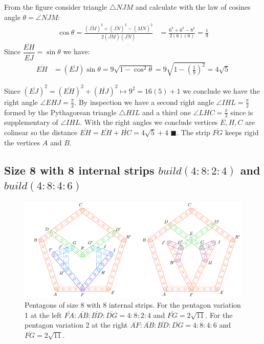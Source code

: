 \documentclass[11pt]{article}
\begin{document}
From the figure consider triangle $\triangle{NJM}$ and calculate with the law of cosines angle $\theta = \angle{NJM}$:
\begin{align}
\cos\theta = \frac{(\overline{JM})^2 + (\overline{JN})^2 
 - (\overline{MN})^2}{2(\overline{JM})(\overline{JN})}
 &= \frac{6^2 + 6^2 - 8^2}{2(6)(6)} = \frac{1}9
\end{align}
Since $\dfrac{\overline{EH}}{\overline{EJ}} = \sin\theta$ we have:
\begin{align}
\overline{EH} &= (\overline{EJ})\sin\theta
 = 9\sqrt{1-\cos^2\theta} 
 = 9\sqrt{1-\left(\frac{1}9\right)^2} = 4\sqrt5
\end{align}

Since $(\overline{EJ})^2 = (\overline{EH})^2 + (\overline{HJ})^2 \mapsto 9^2 = 16(5) + 1$ we conclude we have the right angle $\angle{EHJ} = \frac{\pi}2$. By inspection we have a second right angle $\angle{IHL} = \frac{\pi}2$ formed by the Pythagorean triangle $\triangle{HIL}$ and a third one $\angle{LHC} = \frac{\pi}2$ since is supplementary of $\angle{IHL}$. With the right angles we conclude vertices $E,H,C$ are colinear so the distance $\overline{EH} = \overline{EH} + \overline{HC} = 4\sqrt{5} + 4$ $\blacksquare$.
The strip $\overline{FG}$ keeps rigid the vertices $A$ and $B$.

\subsection{Size 8 with 8 internal strips $build(4:8:2:4)$ and $build(4:8:4:6)$}

\begin{figure}[H]
\centering
\includegraphics[scale=1]{8/penta8-8a}
\caption{Pentagons of size 8 with 8 internal strips. For the pentagon variation 1 at the left $\overline{FA}:\overline{AB}:\overline{BD}:\overline{DG} = 4:8:2:4$ and $\overline{FG}=2\sqrt{11}$. For the pentagon variation 2 at the right $\overline{AF}:\overline{AB}:\overline{BD}:\overline{DG} = 4:8:4:6$ and $\overline{FG}=2\sqrt{11}$.}
\label{fig:penta8-8a}
\end{figure}
\end{document}
